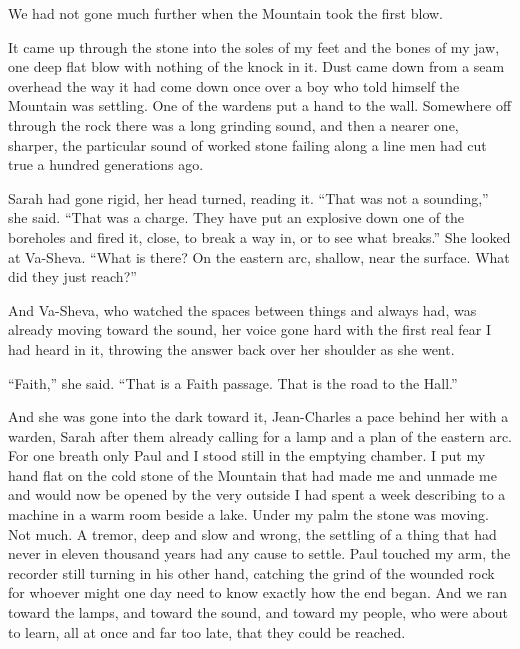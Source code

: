 \ornament

We had not gone much further when the Mountain took the first blow.\par

It came up through the stone into the soles of my feet and the bones of my jaw, one deep flat blow with nothing of the knock in it. Dust came down from a seam overhead the way it had come down once over a boy who told himself the Mountain was settling. One of the wardens put a hand to the wall. Somewhere off through the rock there was a long grinding sound, and then a nearer one, sharper, the particular sound of worked stone failing along a line men had cut true a hundred generations ago.\par

Sarah had gone rigid, her head turned, reading it. ``That was not a sounding,'' she said. ``That was a charge. They have put an explosive down one of the boreholes and fired it, close, to break a way in, or to see what breaks.'' She looked at Va-Sheva. ``What is there? On the eastern arc, shallow, near the surface. What did they just reach?''\par

And Va-Sheva, who watched the spaces between things and always had, was already moving toward the sound, her voice gone hard with the first real fear I had heard in it, throwing the answer back over her shoulder as she went.\par

``Faith,'' she said. ``That is a Faith passage. That is the road to the Hall.''\par

And she was gone into the dark toward it, Jean-Charles a pace behind her with a warden, Sarah after them already calling for a lamp and a plan of the eastern arc. For one breath only Paul and I stood still in the emptying chamber. I put my hand flat on the cold stone of the Mountain that had made me and unmade me and would now be opened by the very outside I had spent a week describing to a machine in a warm room beside a lake. Under my palm the stone was moving. Not much. A tremor, deep and slow and wrong, the settling of a thing that had never in eleven thousand years had any cause to settle. Paul touched my arm, the recorder still turning in his other hand, catching the grind of the wounded rock for whoever might one day need to know exactly how the end began. And we ran toward the lamps, and toward the sound, and toward my people, who were about to learn, all at once and far too late, that they could be reached.\par
